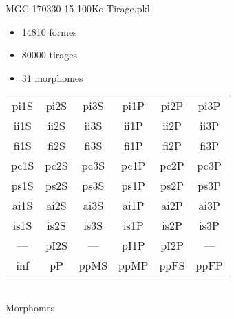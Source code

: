 MGC-170330-15-100Ko-Tirage.pkl
\begin{itemize}
\item 14810 formes
\item 80000 tirages
\item 31 morphomes
\end{itemize}
\begin{center}
\begin{tabular}{cccccc}
\hline
\cellcolor{white}pi1S & \cellcolor{orange}pi2S & \cellcolor{orange}pi3S & \cellcolor{white}pi1P & \cellcolor{white}pi2P & \cellcolor{white}pi3P\\
\cellcolor{brown}ii1S & \cellcolor{brown}ii2S & \cellcolor{brown}ii3S & \cellcolor{white}ii1P & \cellcolor{white}ii2P & \cellcolor{brown}ii3P\\
\cellcolor{yellow}fi1S & \cellcolor{lime}fi2S & \cellcolor{lime}fi3S & \cellcolor{green}fi1P & \cellcolor{white}fi2P & \cellcolor{green}fi3P\\
\cellcolor{yellow}pc1S & \cellcolor{yellow}pc2S & \cellcolor{yellow}pc3S & \cellcolor{white}pc1P & \cellcolor{white}pc2P & \cellcolor{yellow}pc3P\\
\cellcolor{teal}ps1S & \cellcolor{teal}ps2S & \cellcolor{teal}ps3S & \cellcolor{white}ps1P & \cellcolor{white}ps2P & \cellcolor{teal}ps3P\\
\cellcolor{white}ai1S & \cellcolor{lightgray}ai2S & \cellcolor{lightgray}ai3S & \cellcolor{white}ai1P & \cellcolor{pink}ai2P & \cellcolor{white}ai3P\\
\cellcolor{pink}is1S & \cellcolor{pink}is2S & \cellcolor{lightgray}is3S & \cellcolor{pink}is1P & \cellcolor{black}is2P & \cellcolor{pink}is3P\\
--- & \cellcolor{white}pI2S & --- & \cellcolor{white}pI1P & \cellcolor{white}pI2P & ---\\
\cellcolor{white}inf & \cellcolor{white}pP & \cellcolor{white}ppMS & \cellcolor{white}ppMP & \cellcolor{white}ppFS & \cellcolor{white}ppFP\\
\hline
\end{tabular}\\
Morphomes
\end{center}
\bigskip

